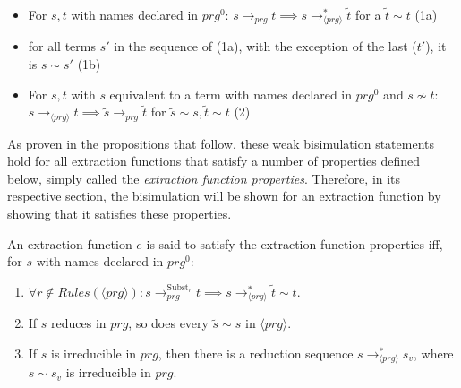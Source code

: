 \begin{itemize}
\item For $s,t$ with names declared in $prg^0$: $s \longrightarrow_{prg} t \implies s  \longrightarrow^*_{\langle prg \rangle} \tilde{t}$ for a $\tilde{t} \sim t$ (1a)

\item for all terms $s'$ in the sequence of (1a), with the exception of the last ($t'$), it is $s \sim s'$ (1b)

\item For $s,t$ with $s$ equivalent to a term with names declared in $prg^0$ and $s \not\sim t$: $s \longrightarrow_{\langle prg \rangle} t \implies \tilde{s} \longrightarrow_{prg} \tilde{t}$ for $\tilde{s} \sim s, \tilde{t} \sim t$ (2)

\end{itemize}

As proven in the propositions that follow, these weak bisimulation statements hold for all extraction functions that satisfy a number of properties defined below, simply called the \textit{extraction function properties}. Therefore, in its respective section, the bisimulation will be shown for an extraction function by showing that it satisfies these properties.

\begin{definition}
An extraction function $e$ is said to satisfy the extraction function properties iff, for $s$ with names declared in $prg^0$:

\begin{enumerate}
\item $\forall r \not\in Rules(\langle prg \rangle): s \longrightarrow^{\textrm{Subst}_r}_{prg} t \implies s \longrightarrow^*_{\langle prg \rangle} \widetilde{t} \sim t$.

\item If $s$ reduces in $prg$, so does every $\widetilde{s} \sim s$ in $\langle prg \rangle$.

\item If $s$ is irreducible in $prg$, then there is a reduction sequence $s \longrightarrow^*_{\langle prg \rangle} s_v$, where $s \sim s_v$ is irreducible in $prg$.

\end{enumerate}

\end{definition}

